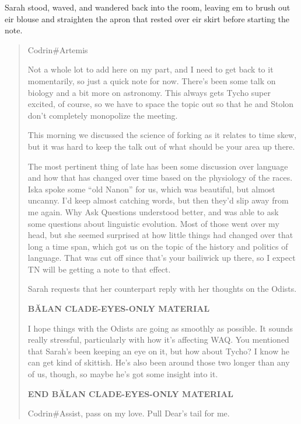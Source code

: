 Sarah stood, waved, and wandered back into the room, leaving em to brush out eir blouse and straighten the apron that rested over eir skirt before starting the note.

\begin{quote}
Codrin\#Artemis

Not a whole lot to add here on my part, and I need to get back to it momentarily, so just a quick note for now. There's been some talk on biology and a bit more on astronomy. This always gets Tycho super excited, of course, so we have to space the topic out so that he and Stolon don't completely monopolize the meeting.

This morning we discussed the science of forking as it relates to time skew, but it was hard to keep the talk out of what should be your area up there.

The most pertinent thing of late has been some discussion over language and how that has changed over time based on the physiology of the races. Iska spoke some ``old Nanon'' for us, which was beautiful, but almost uncanny. I'd keep almost catching words, but then they'd slip away from me again. Why Ask Questions understood better, and was able to ask some questions about linguistic evolution. Most of those went over my head, but she seemed surprised at how little things had changed over that long a time span, which got us on the topic of the history and politics of language. That was cut off since that's your bailiwick up there, so I expect TN will be getting a note to that effect.

Sarah requests that her counterpart reply with her thoughts on the Odists.

\textbf{BĂLAN CLADE-EYES-ONLY MATERIAL}

I hope things with the Odists are going as smoothly as possible. It sounds really stressful, particularly with how it's affecting WAQ. You mentioned that Sarah's been keeping an eye on it, but how about Tycho? I know he can get kind of skittish. He's also been around those two longer than any of us, though, so maybe he's got some insight into it.

\textbf{END BĂLAN CLADE-EYES-ONLY MATERIAL}

Codrin\#Assist, pass on my love. Pull Dear's tail for me.
\end{quote}
